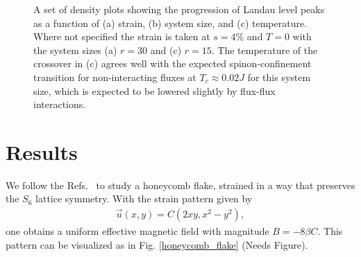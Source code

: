 \documentclass[reprint,amsmath,amssymb,aps,prl,groupedaddress,nofootinbib,superscriptaddress]{revtex4-1}
\newcommand{\1}{\mathds{1}}
\newcommand{\bp}{ \color{straw} }
\begin{document}
\begin{figure}
	\centering
	\caption{A set of density plots showing the progression of Landau level peaks as a function of (a) strain, (b) system size, and (c) temperature. Where not specified the strain is taken at $s=4$\% and $T=0$ with the system sizes (a) $r = 30$ and (c) $r = 15$. The temperature of the crossover in (c) agrees well with the expected spinon-confinement transition for non-interacting fluxes at $T_c \approx 0.02J$ for this system size, which is expected to be lowered slightly by flux-flux interactions.} 
	\label{colorPlots}
\end{figure}

\section{Results} 
We follow the Refs.~\cite{Guinea10,Amal13,Rachel15} to study a honeycomb flake, strained in a way that preserves the $S_6$ lattice symmetry. With the strain pattern given by%
\begin{align}
\vec{u}(x,y) = C(2xy,x^2-y^2),
\end{align}
one obtains a uniform effective magnetic field with magnitude $B = -8 \beta C$. This pattern can be visualized as in Fig. \ref{honeycomb_flake} {\bp(Needs Figure)}.
\end{document}
